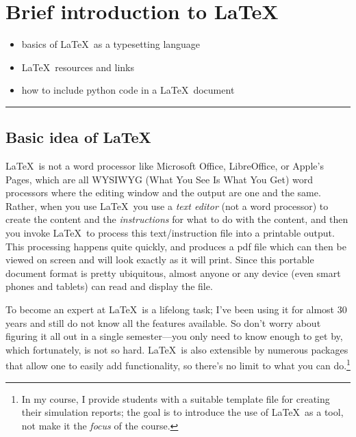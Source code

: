 \chapter{Brief introduction to \LaTeX\ }
\label{assignment:01} 
 \vspace*{-2.0cm}
\begin{flushright}
	\parbox{8cm}
		{
		\begin{flushright}%
		\begin{itemize}\color[RGB]{0,128,128}
		\item basics of \LaTeX\ as a typesetting language 
		\item \LaTeX\ resources and links
		\item how to include python code in a \LaTeX\ document
		\end{itemize}
		\vspace*{5mm}
		\end{flushright}
		}
\end{flushright}
\rule{\textwidth}{0.75pt}
\section{Basic idea of \LaTeX\ }\label{sec:basic}
\LaTeX\ is not a word processor like Microsoft Office, LibreOffice, or Apple's Pages, which are all WYSIWYG (What You See Is What You Get) word processors where the editing window and the output are one and the same. Rather, when you use \LaTeX\, you use a \textit{text editor} (not a word processor) to create the content and the \textit{instructions} for what to do with the content, and then you invoke \LaTeX\ to process this text/instruction file into a printable output. This processing happens quite quickly, and produces a pdf file which can then be viewed on screen and will look exactly as it will print. Since this portable document format is pretty ubiquitous, almost anyone or any device (even smart phones and tablets) can read and display the file. 


To become an expert at \LaTeX\ is a lifelong task; I've been using it for almost 30 years and still do not know all the features available. So don't worry about figuring it all out in a single semester---you only need to know enough to get by, which fortunately, is not so hard. \LaTeX\ is also extensible by numerous packages that allow one to easily add functionality, so there's no limit to what you can do.\footnote{In my course, I provide students with a suitable template file for creating their simulation reports; the goal is to introduce the use of \LaTeX\ as a tool, not make it the \textit{focus} of the course.}

